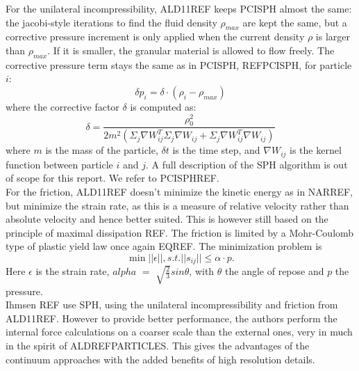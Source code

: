 For the unilateral incompressibility, ALD11REF keeps PCISPH almost the same: the jacobi-style iterations to find the fluid density $\rho_{max}$ are kept the same, but a corrective pressure increment is only applied when the current density $\rho$ is larger than $\rho_{max}$. If it is smaller, the granular material is allowed to flow freely. The corrective pressure term stays the same as in PCISPH, REFPCISPH, for particle $i$:
\begin{equation}
\delta p_i = \delta \cdot (\rho_i - \rho_{max})
\end{equation}
where the corrective factor $\delta$ is computed as:
\begin{equation}
\delta = \frac{\rho_0^2}{2m^2 (\Sigma_j \nabla W_{ij}^T \Sigma_j \nabla W_{ij} + \Sigma_j \nabla W_{ij}^T\nabla W_{ij})}
\end{equation}
where $m$ is the mass of the particle, $\delta t$ is the time step, and $\nabla W_{ij}$ is the kernel function between particle $i$ and $j$. A full description of the SPH algorithm is out of scope for this report. We refer to PCISPHREF.\\

For the friction, ALD11REF doesn't minimize the kinetic energy as in NARREF, but minimize the strain rate, as this is a measure of relative velocity rather than absolute velocity and hence better suited. This is however still based on the principle of maximal dissipation REF. The friction is limited by a Mohr-Coulomb type of plastic yield law once again EQREF. The minimization problem is\\
\begin{equation}
\min ||\epsilon||, s.t. ||s_{ij}|| \leq \alpha \cdot p.
\end{equation}
Here $\epsilon$ is the strain rate, $alpha$ $=$ $\sqrt{\frac{2}{3}} sin \theta$, with $\theta$ the angle of repose and $p$ the pressure.\\

Ihmsen REF use SPH, using the unilateral incompressibility and friction from ALD11REF. However to provide better performance, the authors perform the internal force calculations on a coarser scale than the external ones, very in much in the spirit of ALDREFPARTICLES. This gives the advantages of the continuum approaches with the added benefits of high resolution details.\\


\ifx\isEmbedded\undefined


\pagebreak

\fi